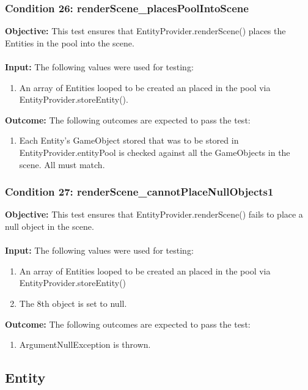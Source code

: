 \documentclass[a4paper,12pt]{article}
\begin{document}
		\subsubsection{Condition 26: renderScene\_placesPoolIntoScene}
			\textbf{Objective:} This test ensures that EntityProvider.renderScene() places the Entities in the pool into the scene.\\\\
			\textbf{Input:} The following values were used for testing:
				\begin{enumerate}
					\item An array of Entities looped to be created an placed in the pool via EntityProvider.storeEntity().
				\end{enumerate}
			\textbf{Outcome:} The following outcomes are expected to pass the test:
				\begin{enumerate}
					\item Each Entity's GameObject stored that was to be stored in EntityProvider.entityPool is checked against all the GameObjects in the scene. All must match.
				\end{enumerate}
		\subsubsection{Condition 27: renderScene\_cannotPlaceNullObjects1}
			\textbf{Objective:} This test ensures that EntityProvider.renderScene() fails to place a null object in the scene.\\\\
			\textbf{Input:} The following values were used for testing:
				\begin{enumerate}
					\item An array of Entities looped to be created an placed in the pool via EntityProvider.storeEntity()
					\item The 8th object is set to null.
				\end{enumerate}
			\textbf{Outcome:} The following outcomes are expected to pass the test:
				\begin{enumerate}
					\item ArgumentNullException is thrown.
				\end{enumerate}
	\subsection{Entity}
\end{document}
